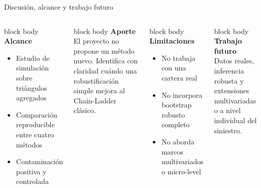 \documentclass[10pt,aspectratio=169]{beamer}
\newcommand{\softcard}[2]{
    \begin{beamercolorbox}[rounded=true,sep=0.9em,wd=\linewidth]{block body}
        {\color{ustaNavy}\textbf{#1}}\\[0.25em]
        #2
    \end{beamercolorbox}
}
\begin{document}
\begin{frame}{Discusión, alcance y trabajo futuro}
    \begin{columns}[T]
        \softcard{Alcance}{
            \begin{itemize}
                \item Estudio de simulación sobre triángulos agregados
                \item Comparación reproducible entre cuatro métodos
                \item Contaminación positiva y controlada
            \end{itemize}
        }

        \vspace{0.35cm}
        \softcard{Aporte}{
            El proyecto no propone un método nuevo. Identifica con claridad cuándo una robustificación simple mejora al Chain-Ladder clásico.
        }

        \softcard{Limitaciones}{
            \begin{itemize}
                \item No trabaja con una cartera real
                \item No incorpora bootstrap robusto completo
                \item No aborda marcos multivariados o micro-level
            \end{itemize}
        }

        \vspace{0.35cm}
        \softcard{Trabajo futuro}{
            Datos reales, inferencia robusta y extensiones multivariadas o a nivel individual del siniestro.
        }
    \end{columns}
\end{frame}
\end{document}
